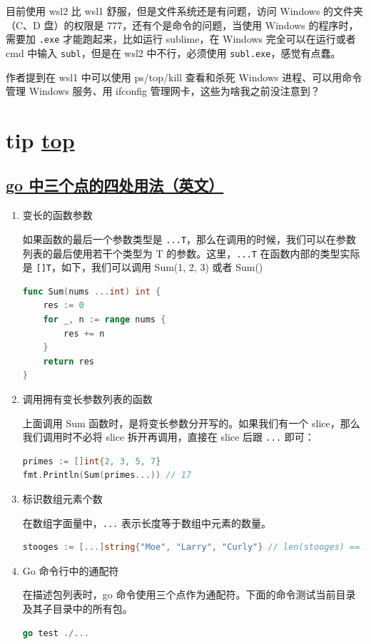 目前使用 wsl2 比 wsl1 舒服，但是文件系统还是有问题，访问 Windows 的文件夹（C、D 盘）的权限是 777，还有个是命令的问题，当使用 Windows 的程序时，需要加 \lstinline{.exe} 才能跑起来，比如运行 sublime，在 Windows 完全可以在运行或者 cmd 中输入 \lstinline{subl}，但是在 wsl2 中不行，必须使用 \lstinline{subl.exe}，感觉有点蠢。

作者提到在 wsl1 中可以使用 ps/top/kill 查看和杀死 Windows 进程、可以用命令管理 Windows 服务、用 ifconfig 管理网卡，这些为啥我之前没注意到？

\section{tip \hyperref[chap:w6]{top}}\label{w6:tip}

\subsection{\href{https://yourbasic.org/golang/three-dots-ellipsis}{go 中三个点的四处用法（英文）}}

\begin{enumerate}
\item 变长的函数参数

如果函数的最后一个参数类型是 \lstinline{...T}，那么在调用的时候，我们可以在参数列表的最后使用若干个类型为 T 的参数。这里，\lstinline{...T} 在函数内部的类型实际是 \lstinline{[]T}，如下，我们可以调用 Sum(1, 2, 3) 或者 Sum()

\begin{lstlisting}[language=Go]
func Sum(nums ...int) int {
    res := 0
    for _, n := range nums {
        res += n
    }
    return res
}
\end{lstlisting}

\item 调用拥有变长参数列表的函数

上面调用 Sum 函数时，是将变长参数分开写的。如果我们有一个 slice，那么我们调用时不必将 slice 拆开再调用，直接在 slice 后跟 \lstinline{...} 即可：

\begin{lstlisting}[language=Go]
primes := []int{2, 3, 5, 7}
fmt.Println(Sum(primes...)) // 17
\end{lstlisting}

\item 标识数组元素个数

在数组字面量中，\lstinline{...} 表示长度等于数组中元素的数量。

\begin{lstlisting}[language=Go]
stooges := [...]string{"Moe", "Larry", "Curly"} // len(stooges) == 3
\end{lstlisting}

\item Go 命令行中的通配符

在描述包列表时，go 命令使用三个点作为通配符。下面的命令测试当前目录及其子目录中的所有包。

\begin{lstlisting}[language=Go]
go test ./...
\end{lstlisting}
\end{enumerate}


